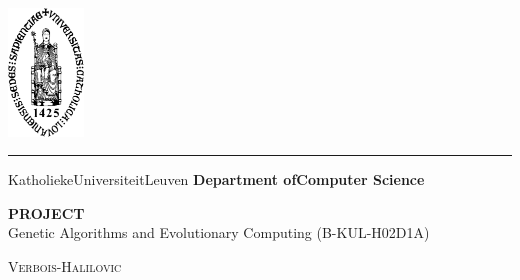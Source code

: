 \documentclass{report}
\begin{document}
\begin{titlepage}
	\newpage
	\thispagestyle{empty}
	\frenchspacing
	\hspace{-0.2cm}
	\includegraphics[height=3.4cm]{sedes}
	\hspace{0.2cm}
	\rule{0.5pt}{3.4cm}
	\hspace{0.2cm}
	\begin{minipage}[b]{8cm}
		\Large{Katholieke\newline Universiteit\newline Leuven}\smallskip\newline
		\large{}\smallskip\newline
		\textbf{Department of\newline Computer Science}\smallskip
	\end{minipage}
	\vspace*{3.2cm}\vfill
	\begin{center}
		\begin{minipage}[t]{\textwidth}
			\begin{center}
				\LARGE{\rm{\textbf{\uppercase{Project}}}}\\
				\Large{\rm{Genetic Algorithms and Evolutionary Computing (B-KUL-H02D1A) }}\\
				\vspace{0.5cm}

			    \large{\textsc{Verbois-Halilovic}}%

			\end{center}
		\end{minipage}
	\end{center}
	\vfill
	\hfill{}
\end{titlepage}

\newpage
\tableofcontents
\newpage
\end{document}
